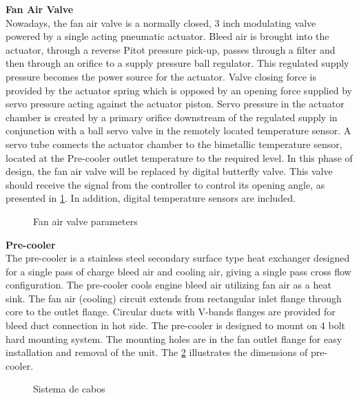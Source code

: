\textbf{Fan Air Valve}\\
Nowadays, the fan air valve is a normally closed, 3 inch modulating valve powered by a single acting pneumatic actuator. Bleed air is brought into the actuator, through a reverse Pitot pressure pick-up, passes through a filter and then through an orifice to a supply pressure ball regulator. This regulated supply pressure becomes the power source for the actuator. Valve closing force is provided by the actuator spring which is opposed by an opening force supplied by servo pressure acting against the actuator piston.
Servo pressure in the actuator chamber is created by a primary orifice downstream of the regulated supply in conjunction with a ball servo valve in the remotely located temperature sensor. A servo tube connects the actuator chamber to the bimetallic temperature sensor, located at the Pre-cooler outlet temperature to the required level.
In this phase of design, the fan air valve will be replaced by digital butterfly valve. This valve should receive the signal from the controller to control its opening angle, as presented in \ref{fig:Valve}. In addition, digital temperature sensors are included.

\begin{figure}[H] %
\caption{Fan air valve parameters}
\label{fig:Valve}
\end{figure}

\textbf{Pre-cooler}\\
The pre-cooler is a stainless steel secondary surface type heat exchanger designed for a single pass of charge bleed air and cooling air, giving a single pass cross flow configuration.
The pre-cooler cools engine bleed air utilizing fan air as a heat sink. The fan air (cooling) circuit extends from rectangular inlet flange through core to the outlet flange. Circular ducts with V-bands flanges are provided for bleed duct connection in hot side. The pre-cooler is designed to mount on 4 bolt hard mounting system. The mounting holes are in the fan outlet flange for easy installation and removal of the unit.
The \ref{fig:Precooler} illustrates the dimensions of pre-cooler.

\begin{figure}[H] %
\caption{Sistema de cabos}
\label{fig:Precooler}
\end{figure}

